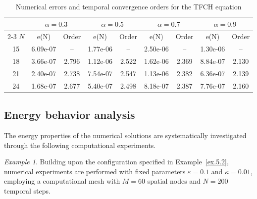 \documentclass{siamart171218}
\theoremstyle{remark}
\theoremstyle{example}
\newtheorem*{example}{Example}  %
\numberwithin{equation}{section}
\begin{document}
\begin{table}[htbp]
\caption{Numerical errors and temporal convergence orders for the TFCH equation}
\label{table.5.2}
\centering
\renewcommand{\arraystretch}{1.1}
\begin{tabular}{c|cc|cc|cc|cc}
&\multicolumn{2}{c|}{$\alpha=0.3$}
&\multicolumn{2}{c|}{$\alpha=0.5$}
&\multicolumn{2}{c|}{$\alpha=0.7$}
&\multicolumn{2}{c}{$\alpha=0.9$} \\
\cline{2-3} \cline{4-5} \cline{6-7}\cline{8-9}
$N$&e(N) & Order &e(N) & Order &e(N) & Order &e(N) & Order\\
\hline
15 &6.09e-07 &-- &1.77e-06 &-- &2.50e-06 &-- &1.30e-06 &-- \\
18 &3.66e-07 &2.796 &1.12e-06&2.522 &1.62e-06&2.369 &8.84e-07&2.130\\
21 &2.40e-07 &2.738&7.54e-07&2.547&1.13e-06&2.382 &6.36e-07&2.139\\
24 &1.68e-07 &2.677&5.40e-07&2.498&8.18e-07&2.387 &7.76e-07&2.160\\
\hline
\end{tabular}
\end{table}



\subsection{Energy behavior analysis}

The energy properties of the numerical solutions are systematically investigated through the following computational experiments.

\begin{example}\label{ex.5.3}
Building upon the configuration specified in Example~\ref{ex.5.2}, numerical experiments are performed with fixed parameters $\varepsilon = 0.1$ and $\kappa = 0.01$, employing a computational mesh with $M = 60$ spatial nodes and $N = 200$ temporal steps.
\end{example}
\end{document}

